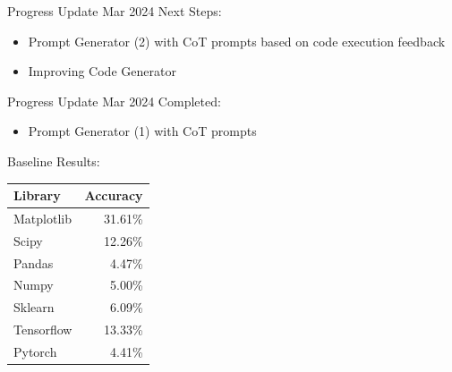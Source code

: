 \begin{frame}{Progress Update  Mar 2024}
    Next Steps:
    \begin{itemize}
        \item Prompt Generator (2) with CoT prompts based on code execution feedback
        \item Improving Code Generator
    \end{itemize}
\end{frame}

\begin{frame}{Progress Update  Mar 2024}
    Completed:
    \begin{itemize}
        \item Prompt Generator (1) with CoT prompts
    \end{itemize}

    Baseline Results:
    \begin{tabular}{lr}
        Library    & Accuracy \\
        \hline
        Matplotlib & 31.61\%  \\
        Scipy      & 12.26\%  \\
        Pandas     & 4.47\%   \\
        Numpy      & 5.00\%   \\
        Sklearn    & 6.09\%   \\
        Tensorflow & 13.33\%  \\
        Pytorch    & 4.41\%   \\
    \end{tabular}
\end{frame}
